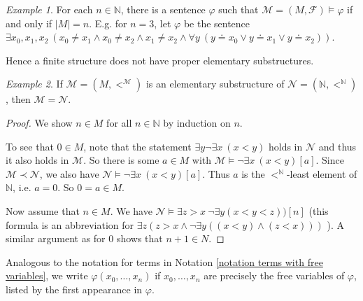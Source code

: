 \documentclass[a4paper, 11pt]{amsart}
\theoremstyle{remark}
\newtheorem{example}[example]{Example}
\newcommand{\NN}{\mathbb{N}}
\newcommand{\cF}{\mathcal F}
\newcommand{\cM}{\mathcal M}
\newcommand{\cN}{\mathcal N}
\begin{document}
\begin{example} 
For each $n\in\NN$, there is a sentence $\varphi$ such that $\cM=(M,\cF)\models \varphi$ if and only if $|M|=n$. 
E.g. for $n=3$, let $\varphi$ be the sentence $\exists x_0, x_1, x_2\ (x_0\neq x_1 \wedge x_0\neq x_2 \wedge x_1\neq x_2 \wedge \forall y\ (y \doteq x_0 \vee y\doteq x_1 \vee y\doteq x_2))$. 

Hence a finite structure does not have proper elementary substructures. 
\end{example} 


\begin{example} 
If $\cM=(M,<^\cM)$ is an elementary substructure of $\cN=(\NN,<^\NN)$, then $\cM=\cN$. 
\end{example} 
\begin{proof} 
We show $n\in M$ for all $n\in \NN$ by induction on $n$. 

To see that $0\in M$, note that the statement $\exists y \neg \exists x\ (x < y)$ holds in $\cN$ and thus it also holds in $\cM$. 
So there is some $a\in M$ with $\cM\models \neg \exists x\ (x < y) [a]$. 
Since $\cM\prec \cN$, we also have $\cN\models \neg \exists x\ (x < y) [a]$. 
Thus $a$ is the $<^\NN$-least element of $\NN$, i.e. $a=0$. 
So $0=a\in M$. 

Now assume that $n\in M$. We have $\cN \models \exists z>x\ \neg \exists y (x<y<z)) [n]$ 
(this formula is an abbreviation for $\exists z (z>x\wedge \neg \exists y ((x<y)  \wedge (z<x)))$ ). 
A similar argument as for $0$ shows that $n+1\in N$. 
\end{proof} 


Analogous to the notation for terms in Notation \ref{notation terms with free variables}, we write $\varphi(x_0,\dots,x_n)$ if $x_0,\dots,x_n$ are precisely the free variables of $\varphi$, listed by the first appearance in $\varphi$. 
\end{document}
